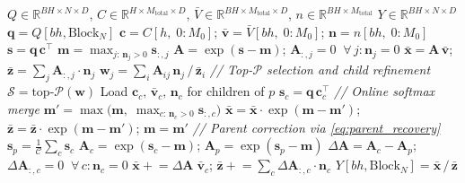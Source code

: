 \begin{algorithm}[h!]
\caption{Flash AVQ-Attention kernel.}
\label{alg:fusedattention}
\begin{algorithmic}[1]
\Require $Q \in \mathbb{R}^{BH \times N \times D}$, \; $C \in \mathbb{R}^{H \times M_{\text{total}} \times D}$, \; $\bar{V} \in \mathbb{R}^{BH \times M_{\text{total}} \times D}$, \; $n \in \mathbb{R}^{BH \times M_{\text{total}}}$
\Ensure $Y \in \mathbb{R}^{BH \times N \times D}$
 
    \State $\mathbf{q} = Q[bh, \text{Block}_N]$ 
    \State $\mathbf{c} = C[h,\; 0\!:\!M_0]$; \quad $\bar{\mathbf{v}} = \bar{V}[bh,\; 0\!:\!M_0]$; \quad $\mathbf{n} = n[bh,\; 0\!:\!M_0]$ 
    \State $\mathbf{s} = \mathbf{q}\, \mathbf{c}^\top$ 
    \State $\mathbf{m} = \max_{j:\, \mathbf{n}_j > 0} \mathbf{s}_{:,j}$ 
    \State $\mathbf{A} = \exp(\mathbf{s} - \mathbf{m})$; \quad $\mathbf{A}_{:,j} = 0 \;\; \forall\, j\!: \mathbf{n}_j {=} 0$
    \State $\bar{\mathbf{x}} = \mathbf{A}\, \bar{\mathbf{v}}$; \quad $\bar{\mathbf{z}} = \textstyle\sum_j \mathbf{A}_{:,j} \cdot \mathbf{n}_j$
    \State $\mathbf{w}_j = \textstyle\sum_{i} \mathbf{A}_{ij}\, \mathbf{n}_j \,/\, \bar{\mathbf{z}}_i$ 
    \Statex \quad \textit{// Top-$\mathcal{P}$ selection and child refinement}
    \State $\mathcal{S} = \text{top-}\mathcal{P}(\mathbf{w})$ 
     
        \State Load $\mathbf{c}_c,\, \bar{\mathbf{v}}_c,\, \mathbf{n}_c$ for children of $p$
        \State $\mathbf{s}_c = \mathbf{q}\, \mathbf{c}_c^\top$ 
        \Statex \quad\quad \textit{// Online softmax merge}
        \State $\mathbf{m}' = \max\!\big(\mathbf{m},\; \max_{c:\, \mathbf{n}_c > 0} \mathbf{s}_{:,c}\big)$
        \State $\bar{\mathbf{x}} = \bar{\mathbf{x}} \cdot \exp(\mathbf{m} - \mathbf{m}')$; \quad $\bar{\mathbf{z}} = \bar{\mathbf{z}} \cdot \exp(\mathbf{m} - \mathbf{m}')$; \quad $\mathbf{m} = \mathbf{m}'$
        \Statex \quad\quad \textit{// Parent correction via \cref{eq:parent_recovery}}
        \State $\mathbf{s}_p = \frac{1}{\mathcal{C}} \textstyle\sum_c \mathbf{s}_c$ 
        \State $\mathbf{A}_c = \exp(\mathbf{s}_c - \mathbf{m})$; \quad $\mathbf{A}_p = \exp(\mathbf{s}_p - \mathbf{m})$
        \State $\Delta\!\mathbf{A} = \mathbf{A}_c - \mathbf{A}_p$; \quad $\Delta\!\mathbf{A}_{:,c} = 0 \;\; \forall\, c\!: \mathbf{n}_c {=} 0$
        \State $\bar{\mathbf{x}} \mathrel{+}= \Delta\!\mathbf{A}\; \bar{\mathbf{v}}_c$; \quad $\bar{\mathbf{z}} \mathrel{+}= \textstyle\sum_c \Delta\!\mathbf{A}_{:,c} \cdot \mathbf{n}_c$
    \EndFor
    \State $Y[bh, \text{Block}_N] = \bar{\mathbf{x}} \,/\, \bar{\mathbf{z}}$
\EndFor
\end{algorithmic}
\end{algorithm}
